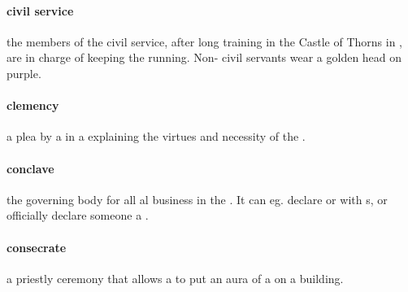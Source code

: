 \paragraph{civil service} the members of the civil service, after long training in the Castle of Thorns in , are in charge of keeping the  running. Non- civil servants wear a golden  head on purple.
\paragraph{clemency} a plea by a  in a  explaining the virtues and necessity of the .
\paragraph{conclave} the governing body for all al business in the . It can eg. declare  or  with s, or officially declare someone a .
\paragraph{consecrate} a priestly ceremony that allows a  to put an aura of a  on a building.
